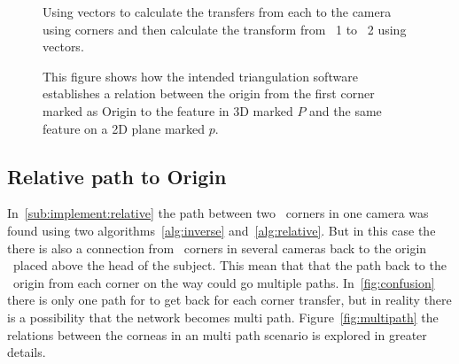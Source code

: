 \begin{figure}
    \centering
    \caption{Using vectors to calculate the transfers from each \aruco to the camera using \aruco corners and then calculate the transform from \aruco\ 1 to \aruco\ 2 using vectors.}
    \label{fig:vector_transfers}
\end{figure}


\begin{figure}[ht]
    \begin{center}
        
    \end{center}
    \caption{ This figure shows how the intended triangulation software establishes a relation between the origin from the first \aruco corner marked as Origin
        to the feature in 3D marked $P$ and the same feature on a 2D plane marked $p$.}
    \label{fig:camera_transfer}
\end{figure}




\subsection{Relative path to Origin}\label{sub:implement:relativepath}
In~\ref{sub:implement:relative} the path between two \aruco\ corners in one camera was found using two algorithms~\ref{alg:inverse} and~\ref{alg:relative}.
But in this case the there is also a connection from \aruco\ corners in several cameras back to the origin \aruco\ placed above the head of the subject.
This mean that that the path back to the \aruco\ origin from each corner on the way could go multiple paths.
In~\ref{fig:confusion} there is only one path for to get back for each corner transfer, but in reality there is a possibility that the network becomes multi path.
Figure~\ref{fig:multipath} the relations between the corneas in an multi path scenario is explored in greater details.


